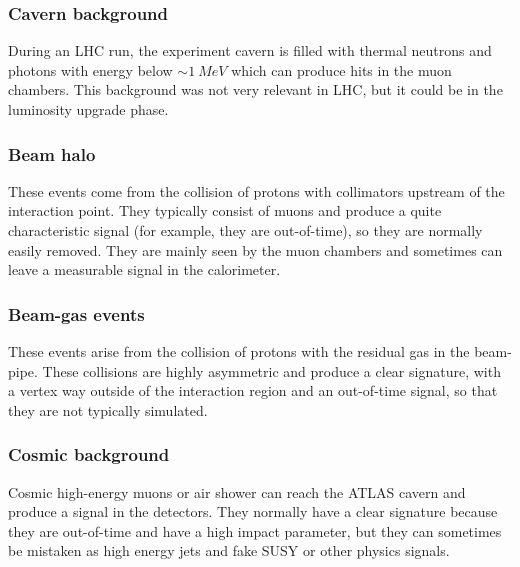 \documentclass[a4paper,twoside,12pt]{article}
\begin{document}

\subsubsection*{Cavern background}
During an LHC run, the experiment cavern is filled with thermal neutrons and photons with 
energy below $\sim 1\ MeV$ which can produce hits in the muon chambers. This background
was not very relevant in LHC, but it could be in the luminosity upgrade phase\cite{ATLAS_pileup}.

\subsubsection*{Beam halo}
These events come from the collision of protons with collimators upstream of the 
interaction point. They typically consist of muons and produce a quite characteristic signal (for example, they are out-of-time), so they are normally easily removed. They are mainly seen by the muon chambers and sometimes
can leave a measurable signal in the calorimeter\cite{ATLAS_pileup}. 

\subsubsection*{Beam-gas events}
These events arise from the collision of protons with the residual gas in the beam-pipe. These
collisions are highly asymmetric and produce a clear signature, with a vertex way outside of
the interaction region and an out-of-time signal, so that they are not typically simulated\cite{ATLAS_pileup}.

\subsubsection*{Cosmic background}
Cosmic high-energy muons or air shower can reach the ATLAS cavern and produce a signal in the detectors.
They normally have a clear signature because they are out-of-time and have a high impact
parameter, but they can sometimes
be mistaken as high energy jets and fake SUSY or other physics signals\cite{ATLAS_cosmic}. \\

\bigskip
\end{document}
